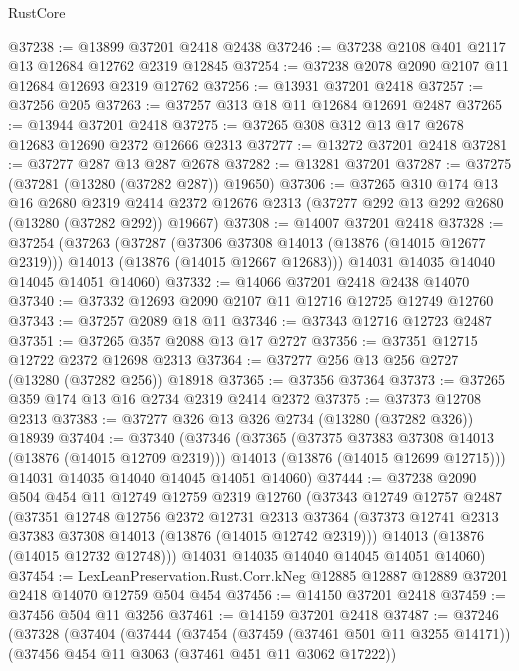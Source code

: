 \begin{lexlean}{RustCore}
\begin{coremodule}
@37238 := @13899 @37201 @2418 @2438
@37246 := @37238 @2108 @401 @2117 @13 @12684 @12762 @2319 @12845
@37254 := @37238 @2078 @2090 @2107 @11 @12684 @12693 @2319 @12762
@37256 := @13931 @37201 @2418
@37257 := @37256 @205
@37263 := @37257 @313 @18 @11 @12684 @12691 @2487
@37265 := @13944 @37201 @2418
@37275 := @37265 @308 @312 @13 @17 @2678 @12683 @12690 @2372 @12666 @2313
@37277 := @13272 @37201 @2418
@37281 := @37277 @287 @13 @287 @2678
@37282 := @13281 @37201
@37287 := @37275 (@37281 (@13280 (@37282 @287)) @19650)
@37306 := @37265
    @310
    @174
    @13
    @16
    @2680
    @2319
    @2414
    @2372
    @12676
    @2313
    (@37277 @292 @13 @292 @2680 (@13280 (@37282 @292)) @19667)
@37308 := @14007 @37201 @2418
@37328 := @37254
    (@37263
      (@37287
        (@37306 @37308 @14013 (@13876 (@14015 @12677 @2319)))
        @14013
        (@13876 (@14015 @12667 @12683)))
      @14031
      @14035
      @14040
      @14045
      @14051
      @14060)
@37332 := @14066 @37201 @2418 @2438 @14070
@37340 := @37332 @12693 @2090 @2107 @11 @12716 @12725 @12749 @12760
@37343 := @37257 @2089 @18 @11
@37346 := @37343 @12716 @12723 @2487
@37351 := @37265 @357 @2088 @13 @17 @2727
@37356 := @37351 @12715 @12722 @2372 @12698 @2313
@37364 := @37277 @256 @13 @256 @2727 (@13280 (@37282 @256)) @18918
@37365 := @37356 @37364
@37373 := @37265 @359 @174 @13 @16 @2734 @2319 @2414 @2372
@37375 := @37373 @12708 @2313
@37383 := @37277 @326 @13 @326 @2734 (@13280 (@37282 @326)) @18939
@37404 := @37340
    (@37346
      (@37365
        (@37375 @37383 @37308 @14013 (@13876 (@14015 @12709 @2319)))
        @14013
        (@13876 (@14015 @12699 @12715)))
      @14031
      @14035
      @14040
      @14045
      @14051
      @14060)
@37444 := @37238
    @2090
    @504
    @454
    @11
    @12749
    @12759
    @2319
    @12760
    (@37343
      @12749
      @12757
      @2487
      (@37351
        @12748
        @12756
        @2372
        @12731
        @2313
        @37364
        (@37373 @12741 @2313 @37383 @37308 @14013 (@13876 (@14015 @12742 @2319)))
        @14013
        (@13876 (@14015 @12732 @12748)))
      @14031
      @14035
      @14040
      @14045
      @14051
      @14060)
@37454 := LexLeanPreservation.Rust.Corr.kNeg
    @12885
    @12887
    @12889
    @37201
    @2418
    @14070
    @12759
    @504
    @454
@37456 := @14150 @37201 @2418
@37459 := @37456 @504 @11 @3256
@37461 := @14159 @37201 @2418
@37487 := @37246
    (@37328
      (@37404
        (@37444
          (@37454
            (@37459 (@37461 @501 @11 @3255 @14171))
            (@37456 @454 @11 @3063 (@37461 @451 @11 @3062 @17222))

\end{coremodule}
\end{lexlean}
